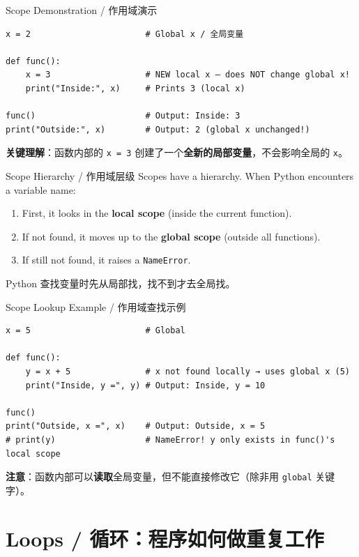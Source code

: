 \documentclass[11pt,a4paper]{report}
\let\oldtexttt\texttt
\renewcommand{\texttt}[1]{\textcolor{mainblue}{\oldtexttt{#1}}}
\begin{document}
\begin{examplebox}{Scope Demonstration / 作用域演示}
\begin{lstlisting}
x = 2                       # Global x / 全局变量

def func():
    x = 3                   # NEW local x — does NOT change global x!
    print("Inside:", x)     # Prints 3 (local x)

func()                      # Output: Inside: 3
print("Outside:", x)        # Output: 2 (global x unchanged!)
\end{lstlisting}
    \textbf{关键理解}：函数内部的 \texttt{x = 3} 创建了一个\textbf{全新的局部变量}，不会影响全局的 \texttt{x}。
\end{examplebox}

\begin{concept}{Scope Hierarchy / 作用域层级}
    Scopes have a hierarchy. When Python encounters a variable name:
    \begin{enumerate}[itemsep=0.3em]
        \item First, it looks in the \textbf{local scope} (inside the current function).
        \item If not found, it moves up to the \textbf{global scope} (outside all functions).
        \item If still not found, it raises a \texttt{NameError}.
    \end{enumerate}
    Python 查找变量时先从局部找，找不到才去全局找。
\end{concept}

\begin{examplebox}{Scope Lookup Example / 作用域查找示例}
\begin{lstlisting}
x = 5                       # Global

def func():
    y = x + 5               # x not found locally → uses global x (5)
    print("Inside, y =", y) # Output: Inside, y = 10

func()
print("Outside, x =", x)    # Output: Outside, x = 5
# print(y)                  # NameError! y only exists in func()'s local scope
\end{lstlisting}
    \textbf{注意}：函数内部可以\textbf{读取}全局变量，但不能直接修改它（除非用 \texttt{global} 关键字）。
\end{examplebox}

\section{Loops / 循环：程序如何做重复工作}
\end{document}
